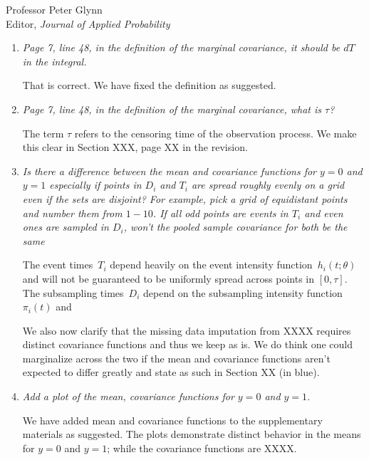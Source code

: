 \documentclass[11pt]{letter} %
\begin{document}
\begin{letter}{Professor
	Peter Glynn\\
	Editor, {\em Journal of Applied Probability}}
\begin{enumerate}
\vspace{5mm}
We thank the referee for this suggestion.  We have now used Remark 2.1 and comment 8 on the computational costs to the end of section 2.2 to motivated our proposed method.
\vspace{5mm}

\item {\it Page 7, line 48, in the definition of the marginal covariance, it should be $dT$ in the integral.}

\vspace{5mm}
That is correct.  We have fixed the definition as suggested.
\vspace{5mm}

\item {\it Page 7, line 48, in the definition of the marginal covariance, what is $\tau$?}

\vspace{5mm}
The term $\tau$ refers to the censoring time of the observation process. We make this clear in Section XXX, page XX in the revision.
\vspace{5mm}


\item {\it Is there a difference between the mean and covariance functions for $y = 0$ and $y = 1$ especially if points in $D_i$ and $T_i$ are spread roughly evenly on a grid even if the sets are disjoint? For example, pick a grid of equidistant points and number them from $1-10$. If all odd points are events in $T_i$ and even ones are sampled in $D_i$, won't the pooled sample covariance for both be the same}

\vspace{5mm}
The event times~$T_i$ depend heavily on the event intensity function~$h_i (t;\theta)$ and will not be guaranteed to be uniformly spread across points in $[0,\tau]$.  The subsampling times~$D_i$ depend on the subsampling intensity function~$\pi_i(t)$ and

We also now clarify that the missing data imputation from XXXX requires distinct covariance functions and thus we keep as is.  We do think one could marginalize across the two if the mean and covariance functions aren't expected to differ greatly and state as such in Section XX (in blue).
\vspace{5mm}

\item {\it Add a plot of the mean, covariance functions for $y=0$ and $y=1$.}

\vspace{5mm}
We have added mean and covariance functions to the supplementary materials as suggested.  The plots demonstrate distinct behavior in the means for $y=0$ and $y=1$; while the covariance functions are XXXX.
\vspace{5mm}


\end{enumerate}
\end{letter}
\end{document}
